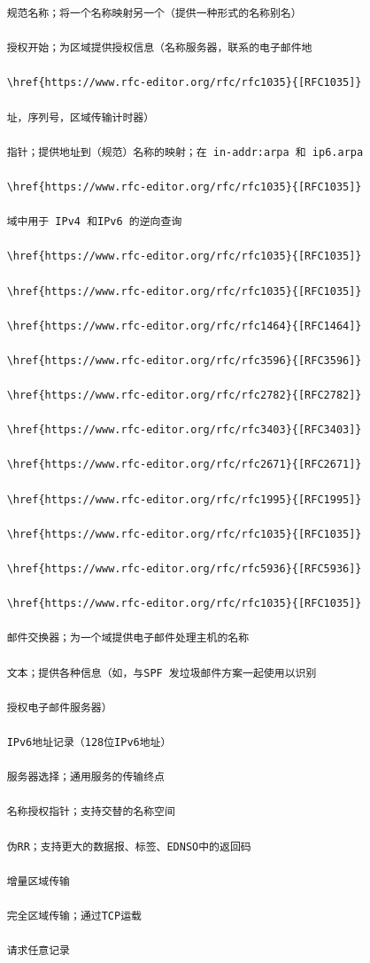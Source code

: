 \begin{verbatim}
    规范名称；将一个名称映射另一个（提供一种形式的名称别名）

    授权开始；为区域提供授权信息（名称服务器，联系的电子邮件地

    \href{https://www.rfc-editor.org/rfc/rfc1035}{[RFC1035]}

    址，序列号，区域传输计时器）

    指针；提供地址到（规范）名称的映射；在 in-addr:arpa 和 ip6.arpa

    \href{https://www.rfc-editor.org/rfc/rfc1035}{[RFC1035]}

    域中用于 IPv4 和IPv6 的逆向查询

    \href{https://www.rfc-editor.org/rfc/rfc1035}{[RFC1035]}

    \href{https://www.rfc-editor.org/rfc/rfc1035}{[RFC1035]}

    \href{https://www.rfc-editor.org/rfc/rfc1464}{[RFC1464]}

    \href{https://www.rfc-editor.org/rfc/rfc3596}{[RFC3596]}

    \href{https://www.rfc-editor.org/rfc/rfc2782}{[RFC2782]}

    \href{https://www.rfc-editor.org/rfc/rfc3403}{[RFC3403]}

    \href{https://www.rfc-editor.org/rfc/rfc2671}{[RFC2671]}

    \href{https://www.rfc-editor.org/rfc/rfc1995}{[RFC1995]}

    \href{https://www.rfc-editor.org/rfc/rfc1035}{[RFC1035]}

    \href{https://www.rfc-editor.org/rfc/rfc5936}{[RFC5936]}

    \href{https://www.rfc-editor.org/rfc/rfc1035}{[RFC1035]}

    邮件交换器；为一个域提供电子邮件处理主机的名称

    文本；提供各种信息（如，与SPF 发垃圾邮件方案一起使用以识别

    授权电子邮件服务器）

    IPv6地址记录（128位IPv6地址）

    服务器选择；通用服务的传输终点

    名称授权指针；支持交替的名称空间

    伪RR；支持更大的数据报、标签、EDNSO中的返回码

    增量区域传输

    完全区域传输；通过TCP运载

    请求任意记录
\end{verbatim}

